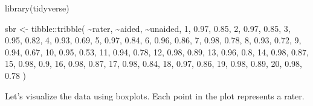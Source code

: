 \documentclass[
  letterpaper,
  DIV=11,
  numbers=noendperiod]{scrreprt}
\newenvironment{Shaded}{\begin{snugshade}}{\end{snugshade}}
\newcommand{\DecValTok}[1]{\textcolor[rgb]{0.68,0.00,0.00}{#1}}
\newcommand{\FloatTok}[1]{\textcolor[rgb]{0.68,0.00,0.00}{#1}}
\newcommand{\FunctionTok}[1]{\textcolor[rgb]{0.28,0.35,0.67}{#1}}
\newcommand{\NormalTok}[1]{\textcolor[rgb]{0.00,0.23,0.31}{#1}}
\newcommand{\OtherTok}[1]{\textcolor[rgb]{0.00,0.23,0.31}{#1}}
\newcommand{\SpecialCharTok}[1]{\textcolor[rgb]{0.37,0.37,0.37}{#1}}
\begin{document}
\begin{Shaded}
\begin{Highlighting}[]
\FunctionTok{library}\NormalTok{(tidyverse)}

\NormalTok{sbr }\OtherTok{\textless{}{-}}\NormalTok{ tibble}\SpecialCharTok{::}\FunctionTok{tribble}\NormalTok{(}
  \SpecialCharTok{\textasciitilde{}}\NormalTok{rater, }\SpecialCharTok{\textasciitilde{}}\NormalTok{aided, }\SpecialCharTok{\textasciitilde{}}\NormalTok{unaided,}
      \DecValTok{1}\NormalTok{,   }\FloatTok{0.97}\NormalTok{,     }\FloatTok{0.85}\NormalTok{,}
      \DecValTok{2}\NormalTok{,   }\FloatTok{0.97}\NormalTok{,     }\FloatTok{0.85}\NormalTok{,}
      \DecValTok{3}\NormalTok{,   }\FloatTok{0.95}\NormalTok{,     }\FloatTok{0.82}\NormalTok{,}
      \DecValTok{4}\NormalTok{,   }\FloatTok{0.93}\NormalTok{,     }\FloatTok{0.69}\NormalTok{,}
      \DecValTok{5}\NormalTok{,   }\FloatTok{0.97}\NormalTok{,     }\FloatTok{0.84}\NormalTok{,}
      \DecValTok{6}\NormalTok{,   }\FloatTok{0.96}\NormalTok{,     }\FloatTok{0.86}\NormalTok{,}
      \DecValTok{7}\NormalTok{,   }\FloatTok{0.98}\NormalTok{,     }\FloatTok{0.78}\NormalTok{,}
      \DecValTok{8}\NormalTok{,   }\FloatTok{0.93}\NormalTok{,     }\FloatTok{0.72}\NormalTok{,}
      \DecValTok{9}\NormalTok{,   }\FloatTok{0.94}\NormalTok{,     }\FloatTok{0.67}\NormalTok{,}
     \DecValTok{10}\NormalTok{,   }\FloatTok{0.95}\NormalTok{,     }\FloatTok{0.53}\NormalTok{,}
     \DecValTok{11}\NormalTok{,   }\FloatTok{0.94}\NormalTok{,     }\FloatTok{0.78}\NormalTok{,}
     \DecValTok{12}\NormalTok{,   }\FloatTok{0.98}\NormalTok{,     }\FloatTok{0.89}\NormalTok{,}
     \DecValTok{13}\NormalTok{,   }\FloatTok{0.96}\NormalTok{,      }\FloatTok{0.8}\NormalTok{,}
     \DecValTok{14}\NormalTok{,   }\FloatTok{0.98}\NormalTok{,     }\FloatTok{0.87}\NormalTok{,}
     \DecValTok{15}\NormalTok{,   }\FloatTok{0.98}\NormalTok{,      }\FloatTok{0.9}\NormalTok{,}
     \DecValTok{16}\NormalTok{,   }\FloatTok{0.98}\NormalTok{,     }\FloatTok{0.87}\NormalTok{,}
     \DecValTok{17}\NormalTok{,   }\FloatTok{0.98}\NormalTok{,     }\FloatTok{0.84}\NormalTok{,}
     \DecValTok{18}\NormalTok{,   }\FloatTok{0.97}\NormalTok{,     }\FloatTok{0.86}\NormalTok{,}
     \DecValTok{19}\NormalTok{,   }\FloatTok{0.98}\NormalTok{,     }\FloatTok{0.89}\NormalTok{,}
     \DecValTok{20}\NormalTok{,   }\FloatTok{0.98}\NormalTok{,     }\FloatTok{0.78}
\NormalTok{  )}
\end{Highlighting}
\end{Shaded}

Let's visualize the data using boxplots. Each point in the plot
represents a rater.
\end{document}
